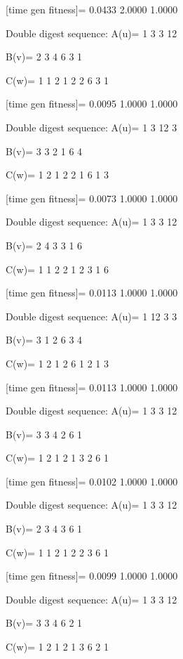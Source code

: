 [time gen fitness]=
    0.0433    2.0000    1.0000

Double digest sequence:
A(u)=
     1     3     3    12

B(v)=
     2     3     4     6     3     1

C(w)=
     1     1     2     1     2     2     6     3     1

[time gen fitness]=
    0.0095    1.0000    1.0000

Double digest sequence:
A(u)=
     1     3    12     3

B(v)=
     3     3     2     1     6     4

C(w)=
     1     2     1     2     2     1     6     1     3

[time gen fitness]=
    0.0073    1.0000    1.0000

Double digest sequence:
A(u)=
     1     3     3    12

B(v)=
     2     4     3     3     1     6

C(w)=
     1     1     2     2     1     2     3     1     6

[time gen fitness]=
    0.0113    1.0000    1.0000

Double digest sequence:
A(u)=
     1    12     3     3

B(v)=
     3     1     2     6     3     4

C(w)=
     1     2     1     2     6     1     2     1     3

[time gen fitness]=
    0.0113    1.0000    1.0000

Double digest sequence:
A(u)=
     1     3     3    12

B(v)=
     3     3     4     2     6     1

C(w)=
     1     2     1     2     1     3     2     6     1

[time gen fitness]=
    0.0102    1.0000    1.0000

Double digest sequence:
A(u)=
     1     3     3    12

B(v)=
     2     3     4     3     6     1

C(w)=
     1     1     2     1     2     2     3     6     1

[time gen fitness]=
    0.0099    1.0000    1.0000

Double digest sequence:
A(u)=
     1     3     3    12

B(v)=
     3     3     4     6     2     1

C(w)=
     1     2     1     2     1     3     6     2     1

